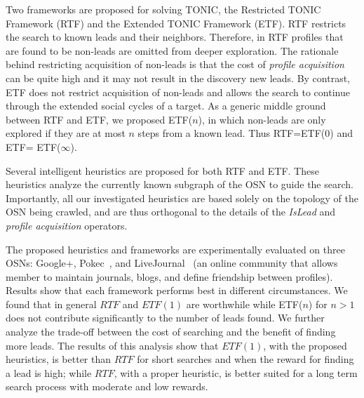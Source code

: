 \documentclass[prodmode,acmtecs]{acmsmall} %
\newcommand{\note}[2]{\textbf{\textsc{#1} says: \textit{#2}}}
\begin{document}
Two frameworks are proposed for solving TONIC, the Restricted TONIC Framework (RTF) and the Extended TONIC Framework (ETF). RTF restricts the search to known leads and their neighbors. Therefore, in RTF profiles that are found to be non-leads are omitted from deeper exploration. The rationale behind restricting acquisition of non-leads is that the cost of {\em profile acquisition} can be quite high and it may not result in the discovery new leads. 
By contrast, ETF does not restrict acquisition of non-leads and allows the search to continue through the extended social cycles of a target. As a generic middle ground between RTF and ETF, we proposed ETF($n$), in which non-leads are only explored if they are at most $n$ steps from a known lead. Thus RTF=ETF(0) and ETF= ETF($\infty$). 

Several intelligent heuristics are proposed for both RTF and ETF. These heuristics analyze the currently known subgraph of the OSN to guide the search. Importantly, all our investigated heuristics are based solely on the topology of the OSN being crawled, and are thus orthogonal to the details of the {\em IsLead} and {\em profile acquisition} operators. 


The proposed heuristics and frameworks are experimentally evaluated on three OSNs: Google+, Pokec~\cite{takac2012data}, and LiveJournal~\cite{backstrom2006groupFormation,leskovec2009community} (an online community that allows member to maintain journals, blogs, and define friendship between profiles). Results show that each framework performs best in different circumstances. We found that in general \(RTF\) and \(ETF(1)\) are worthwhile while  ETF($n$) for $n>1$ does not contribute significantly to the number of leads found. We further analyze the trade-off between the cost of searching and the benefit of finding more leads. The results of this analysis show that \(ETF(1)\), with the proposed heuristics, is better than \(RTF\) for short searches and when the reward for finding a lead is high; while \(RTF\), with a proper heuristic, is better suited for a long term search process with moderate and low rewards. 


\end{document}

